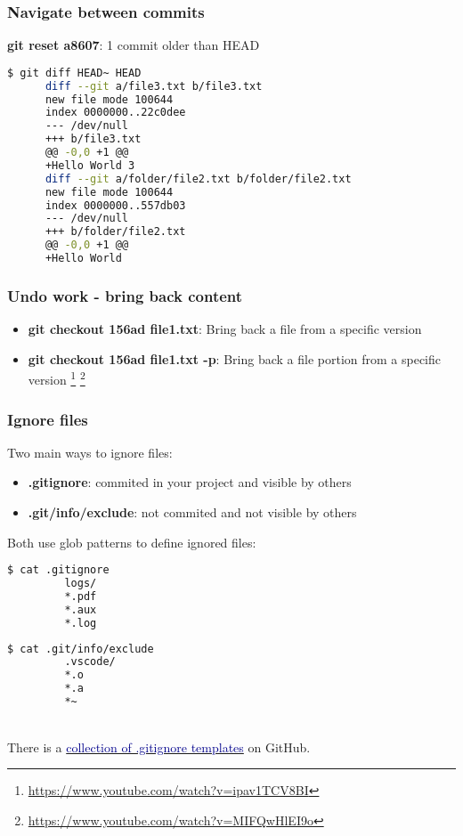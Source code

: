 \begin{frame}[fragile]\frametitle{Navigate between commits}
      \textbf{git reset a8607}: 1 commit older than HEAD
   \vspace{1em}
   \begin{lstlisting}[language=bash, style=bash, autogobble]
      $ git diff HEAD~ HEAD
      diff --git a/file3.txt b/file3.txt
      new file mode 100644
      index 0000000..22c0dee
      --- /dev/null
      +++ b/file3.txt
      @@ -0,0 +1 @@
      +Hello World 3
      diff --git a/folder/file2.txt b/folder/file2.txt
      new file mode 100644
      index 0000000..557db03
      --- /dev/null
      +++ b/folder/file2.txt
      @@ -0,0 +1 @@
      +Hello World
   \end{lstlisting}
\end{frame}

\begin{frame}\frametitle{Undo work - bring back content}
   \begin{itemize}
      \item \textbf{git checkout 156ad file1.txt}: Bring back a file from a specific version
      \item \textbf{git checkout 156ad file1.txt -p}: Bring back a file portion from a specific version
      \footnote{\url{https://www.youtube.com/watch?v=ipav1TCV8BI}}
      \footnote{\url{https://www.youtube.com/watch?v=MIFQwHlEI9o}}
   \end{itemize}
\end{frame}


\begin{frame}[fragile]\frametitle{Ignore files}
   Two main ways to ignore files:
   \begin{itemize}
      \item \textbf{.gitignore}: commited in your project and visible by others
      \item \textbf{.git/info/exclude}: not commited and not visible by others
   \end{itemize}
   \vspace{1em}
   Both use glob patterns to define ignored files:
   \begin{minipage}{0.44\linewidth}
      \begin{lstlisting}[language=bash, style=bash, autogobble]
         $ cat .gitignore
         logs/
         *.pdf
         *.aux
         *.log
      \end{lstlisting}
   \end{minipage}
   \hfill
   \begin{minipage}{0.44\linewidth}
      \begin{lstlisting}[language=bash, style=bash, autogobble]
         $ cat .git/info/exclude
         .vscode/
         *.o
         *.a
         *~
      \end{lstlisting}
   \end{minipage}
   \\[2em]
   There is a \href{https://github.com/github/gitignore}
   {\textcolor{DarkBlue}{collection of .gitignore templates}}
   on GitHub.
\end{frame}

